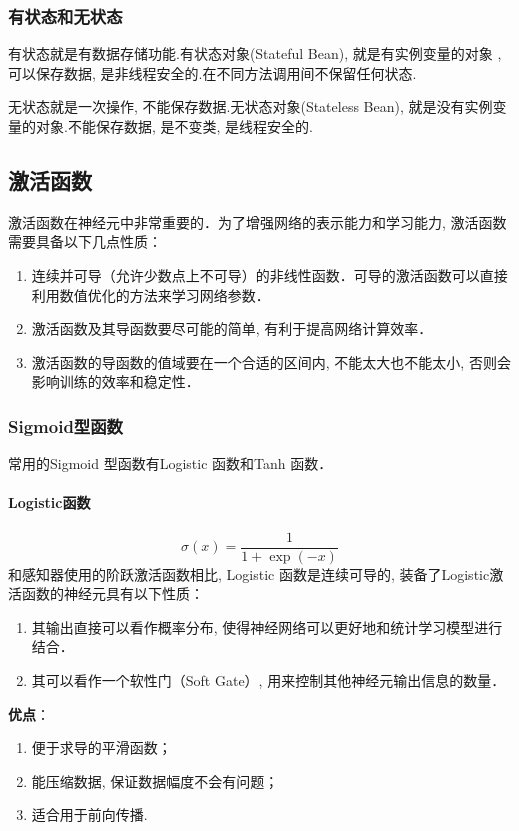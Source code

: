 \documentclass[a4paper]{article}
\theoremstyle{definition}
\numberwithin{equation}{section}
\begin{document}
\subsubsection{有状态和无状态}
有状态就是有数据存储功能.有状态对象(Stateful Bean), 就是有实例变量的对象 , 可以保存数据, 是非线程安全的.在不同方法调用间不保留任何状态.

无状态就是一次操作, 不能保存数据.无状态对象(Stateless Bean), 就是没有实例变量的对象.不能保存数据, 是不变类, 是线程安全的.
 
\subsection{激活函数}
激活函数在神经元中非常重要的．为了增强网络的表示能力和学习能力, 激活函数需要具备以下几点性质：
\begin{enumerate}
\item 连续并可导（允许少数点上不可导）的非线性函数．可导的激活函数可以直接利用数值优化的方法来学习网络参数．
\item 激活函数及其导函数要尽可能的简单, 有利于提高网络计算效率．
\item 激活函数的导函数的值域要在一个合适的区间内, 不能太大也不能太小, 否则会影响训练的效率和稳定性．
\end{enumerate}
\subsubsection{Sigmoid型函数}
常用的Sigmoid 型函数有Logistic 函数和Tanh 函数．
\paragraph{Logistic函数}
$$\sigma(x)=\frac{1}{1+\exp(-x)}$$
和感知器使用的阶跃激活函数相比, Logistic 函数是连续可导的, 
装备了Logistic激活函数的神经元具有以下性质：
\begin{enumerate}
    \renewcommand{\labelenumi}{(\theenumi)}
 \item 其输出直接可以看作概率分布, 使得神经网络可以更好地和统计学习模型进行结合． 
 \item 其可以看作一个软性门（Soft Gate）, 用来控制其他神经元输出信息的数量．
\end{enumerate}

\textbf{优点}：
\begin{enumerate}
    \renewcommand{\labelenumi}{(\theenumi)}
\item 便于求导的平滑函数；
\item 能压缩数据, 保证数据幅度不会有问题；
\item 适合用于前向传播.
\end{enumerate}
\end{document}

